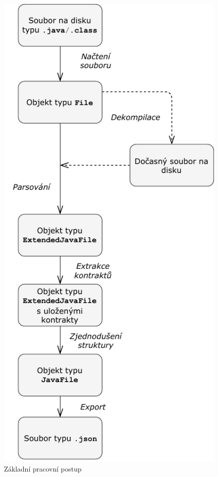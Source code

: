 				\begin{figure}[!htb]
						\centering
						\includegraphics{img/workFlow.pdf}
						\caption[workFlow]{Základní pracovní postup}
						\label{workFlow}
					\endminipage\hfill
				\end{figure}
		
